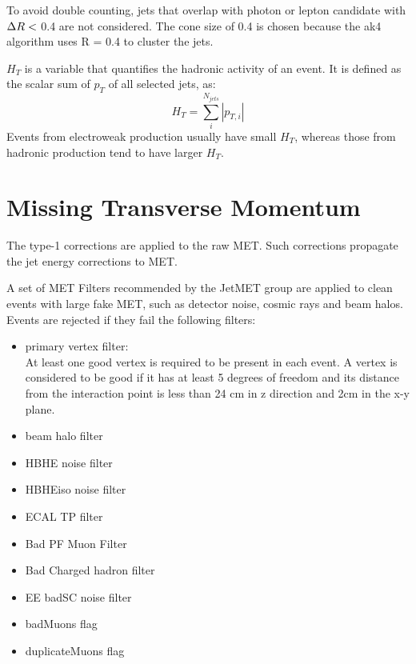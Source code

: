 \documentclass[thesis.tex]{subfiles}
\renewcommand\_{\textunderscore\allowbreak}
\begin{document}
To avoid double counting, jets that overlap with photon or lepton candidate with $\Delta R <$ 0.4 are not considered.
The cone size of 0.4 is chosen because the ak4 algorithm uses R = 0.4 to cluster the jets.  

$H_T$ is a variable that quantifies the hadronic activity of an event. 
It is defined as the scalar sum of $p_T$ of all selected jets, as:
	\begin{equation*}
		 H_T = \sum_i^{N_{jets}}|p_{T,i}|
	\end{equation*}
Events from electroweak production usually have small $H_T$, whereas those from hadronic production tend to have larger $H_T$. 


\section{Missing Transverse Momentum}
\label{type-1-corr}
The type-1 corrections are applied to the raw MET. Such corrections propagate the jet energy corrections to MET.

A set of MET Filters recommended by the JetMET group are applied to clean events with large fake MET, such as detector noise, cosmic rays and beam halos. Events are rejected if they fail the following filters:
\begin{center}
\begin{itemize}
\item primary vertex filter:\\
		At least one good vertex is required to be present in each event. A vertex is considered to be good if it has at least 5 degrees of freedom and its distance from the interaction point is less than 24 cm in z direction and 2cm in the x-y plane. 
\item beam halo filter
\item HBHE noise filter
\item HBHEiso noise filter
\item ECAL TP filter
\item Bad PF Muon Filter
\item Bad Charged hadron filter
\item EE badSC noise filter
\item badMuons flag
\item duplicateMuons flag
\end{itemize}
\end{center}
\end{document}
